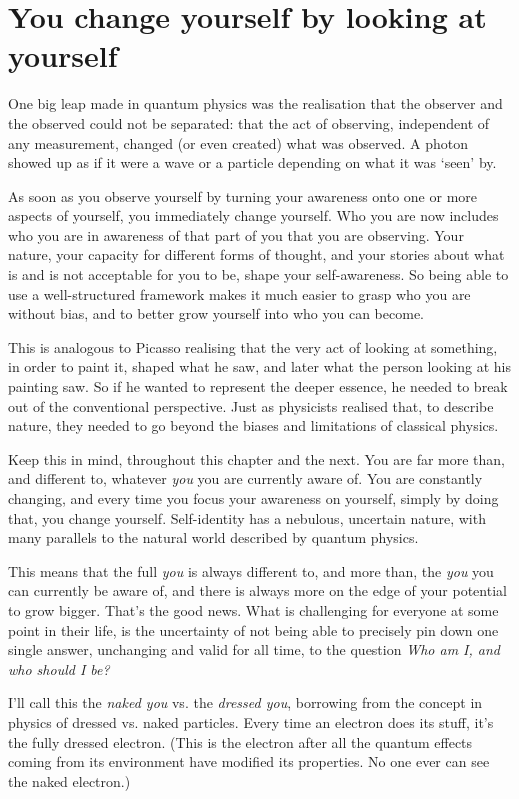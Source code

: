 \section{You change yourself by looking at yourself}
\label{section:dressed-you}
One big leap made in quantum physics  was the realisation that the observer and the observed could not be separated: that the act of observing, independent of any measurement, changed (or even created) what was observed. A photon showed up as if it were a wave or a particle depending on what it was ‘seen’ by.


As soon as you observe yourself by turning your awareness onto one or more aspects of yourself, you immediately change yourself. Who you are now includes who you are in awareness of that part of you that you are observing. Your nature, your capacity for different forms of thought, and your stories about what is and is not acceptable for you to be, shape your self-awareness. So being able to use a well-structured framework makes it much easier to grasp who you are without bias, and to better grow yourself into who you can become.


This is analogous to Picasso  realising that the very act of looking at something, in order to paint it, shaped what he saw, and later what the person looking at his painting saw. So if he wanted to represent the deeper essence, he needed to break out of the conventional perspective. Just as physicists realised that, to describe nature, they needed to go beyond the biases and limitations of classical physics. 


Keep this in mind, throughout this chapter and the next. You are far more than, and different to, whatever \emph{you} you are currently aware of. You are constantly changing, and every time you focus your awareness on yourself, simply by doing that, you change yourself. Self-identity has a nebulous, uncertain nature, with many parallels to the natural world described by quantum physics.


This means that the full \emph{you} is always different to, and more than, the \emph{you} you can currently be aware of, and there is always more on the edge of your potential to grow bigger. That's the good news. What is challenging for everyone at some point in their life, is the uncertainty of not being able to precisely pin down one single answer, unchanging and valid for all time, to the question \emph{Who am I, and who should I be?}


I'll call this the \emph{naked you} vs. the \emph{dressed you}, borrowing from the concept in physics of dressed vs. naked particles. Every time an electron does its stuff, it's the fully dressed electron. (This is the electron after all the quantum effects coming from its environment have modified its properties. No one ever can see the naked electron.)


